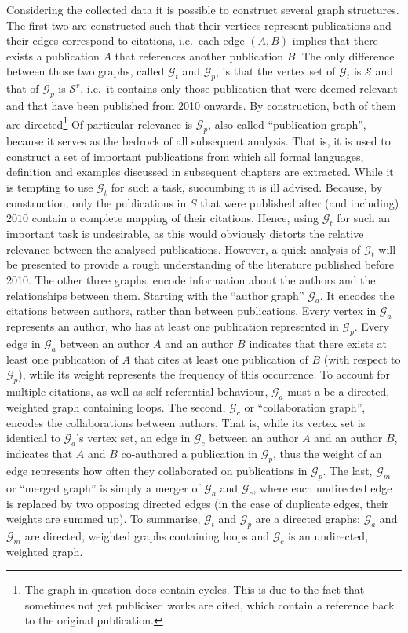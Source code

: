\documentclass[11pt,a4paper]{book}
\theoremstyle{definition}
\theoremstyle{definition}
\theoremstyle{definition}
\theoremstyle{remark}
\newcommand{\pset}{S}
\newcommand{\xset}{\mathcal{S}}
\newcommand{\tgraph}{\mathcal{G}_{t}}
\newcommand{\pgraph}{\mathcal{G}_{p}}
\newcommand{\agraph}{\mathcal{G}_{a}}
\newcommand{\cgraph}{\mathcal{G}_{c}}
\newcommand{\acgraph}{\mathcal{G}_{m}}
\begin{document}
Considering the collected data it is possible to construct several graph structures.
The first two are constructed such that their vertices represent publications and their edges correspond to citations, i.e.\ each edge $(A,B)$ implies that there exists a publication $A$ that references another publication $B$. The only difference between those two graphs, called $\tgraph$ and $\pgraph$, is that the vertex set of $\tgraph$ is $\xset$ and that of $\pgraph$ is $\xset^r$, i.e.\ it contains only those publication that were deemed relevant and that have been published from 2010 onwards.
By construction, both of them are directed\footnote{The graph in question does contain cycles. This is due to the fact that sometimes not yet publicised works are cited, which contain a reference back to the original publication.}
Of particular relevance is $\pgraph$, also called ``publication graph'', because it serves as the bedrock of all subsequent analysis. That is, it is used to construct a set of important publications from which all formal languages, definition and examples discussed in subsequent chapters are extracted.
While it is tempting to use $\tgraph$ for such a task, succumbing it is ill advised. Because, by construction, only the publications in $\pset$ that were published after (and including) $2010$ contain a complete mapping of their citations. Hence, using $\tgraph$ for such an important task is undesirable, as this would obviously distorts the relative relevance between the analysed publications. However, a quick analysis of $\tgraph$ will be presented to provide a rough understanding of the literature published before 2010.
The other three graphs, encode information about the authors and the relationships between them. Starting with the ``author graph'' $\agraph$. It encodes the citations between authors, rather than between publications. Every vertex in $\agraph$ represents an author, who has at least one publication represented in $\pgraph$. Every edge in $\agraph$ between an author $A$ and an author $B$ indicates that there exists at least one publication of $A$ that cites at least one publication of $B$ (with respect to $\pgraph$), while its weight represents the frequency of this occurrence. To account for multiple citations, as well as self-referential behaviour, $\agraph$ must a be a directed, weighted graph containing loops.
The second, $\cgraph$ or ``collaboration graph'', encodes the collaborations between authors. That is, while its vertex set is identical to $\agraph$'s vertex set, an edge in $\cgraph$ between an author $A$ and an author $B$, indicates that $A$ and $B$ co-authored a publication in $\pgraph$, thus the weight of an edge represents how often they collaborated on publications in $\pgraph$. 
The last, $\acgraph$ or ``merged graph'' is simply a merger of $\agraph$ and $\cgraph$, where each undirected edge is replaced by two opposing directed edges (in the case of duplicate edges, their weights are summed up).
To summarise, $\tgraph$ and $\pgraph$ are a directed graphs; $\agraph$ and $\acgraph$ are directed, weighted graphs containing loops and $\cgraph$ is an undirected, weighted graph. 
\end{document}
